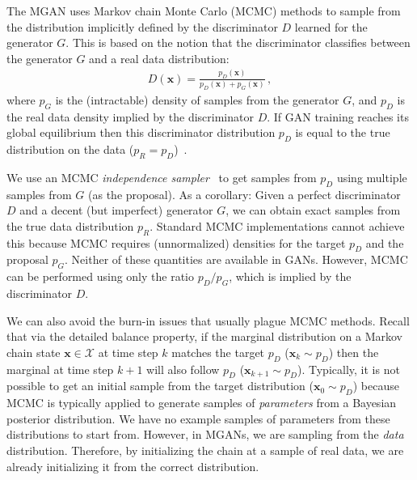 \documentclass{article}
\renewcommand{\vec}[1]{{\boldsymbol{\mathbf{#1}}}} %
\newcommand{\set}[1]{\mathcal{#1}}
\newcommand{\sample}{\sim}
\newcommand{\PG}{{p_G}}
\newcommand{\PD}{{p_D}}
\newcommand{\PR}{{p_R}}
\newcommand{\setx}{\set{X}}
\begin{document}
The MGAN uses Markov chain Monte Carlo (MCMC) methods to sample from the distribution implicitly defined by the discriminator $D$ learned for the generator $G$.
This is based on the notion that the discriminator classifies between the generator $G$ and a real data distribution:
\begin{align}
  D(\vec x) = \frac{\PD(\vec x)}{\PD(\vec x) + \PG(\vec x)}\,,
\end{align}
where $\PG$ is the (intractable) density of samples from the generator $G$, and $\PD$ is the real data density implied by the discriminator $D$.
If GAN training reaches its global equilibrium then this discriminator distribution $\PD$ is equal to the true distribution on the data ($\PR = \PD$)~\citep{Goodfellow2014}.

We use an MCMC \emph{independence sampler}~\citep{Tierney1994} to get samples from $\PD$ using multiple samples from $G$ (as the proposal)\@.
As a corollary: Given a perfect discriminator $D$ and a decent (but imperfect) generator $G$, we can obtain exact samples from the true data distribution $\PR$.
Standard MCMC implementations cannot achieve this because MCMC requires (unnormalized) densities for the target $\PD$ and the proposal $\PG$.
Neither of these quantities are available in GANs.
However, MCMC can be performed using only the ratio $\PD / \PG$, which is implied by the discriminator $D$.

We can also avoid the burn-in issues that usually plague MCMC methods.
Recall that via the detailed balance property, if the marginal distribution on a Markov chain state $\vec x \in \setx$ at time step $k$ matches the target $\PD$ ($\vec x_k \sample \PD$) then the marginal at time step $k+1$ will also follow $\PD$ ($\vec x_{k+1} \sample \PD$)\@.
Typically, it is not possible to get an initial sample from the target distribution ($\vec x_0 \sample \PD$) because MCMC is typically applied to generate samples of \emph{parameters} from a Bayesian posterior distribution.
We have no example samples of parameters from these distributions to start from.
However, in MGANs, we are sampling from the \emph{data} distribution.
Therefore, by initializing the chain at a sample of real data, we are already initializing it from the correct distribution.
\end{document}
